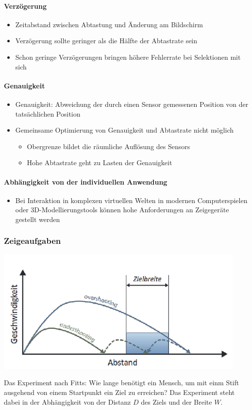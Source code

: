 \documentclass[8pt,a4paper,landscape]{extarticle}
\begin{document}
\begin{multicols*}{4}
	\paragraph{Verzögerung}
	\begin{itemize}
		\item Zeitabstand zwischen Abtastung und Änderung am Bildschirm
		\item Verzögerung sollte geringer als die Hälfte der Abtastrate sein
		\item Schon geringe Verzögerungen bringen höhere Fehlerrate bei
		      Selektionen mit sich
	\end{itemize}
	\paragraph{Genauigkeit}
	\begin{itemize}
		\item Genauigkeit: Abweichung der durch einen Sensor gemessenen Position
		      von der tatsächlichen Position
		\item Gemeinsame Optimierung von Genauigkeit und Abtastrate nicht
		      möglich
		      \begin{itemize}[nolistsep]
			      \item Obergrenze bildet die räumliche Auflösung des Sensors
			      \item Hohe Abtastrate geht zu Lasten der Genauigkeit
		      \end{itemize}
	\end{itemize}
	\paragraph{Abhängigkeit von der individuellen Anwendung}
	\begin{itemize}
		\item Bei Interaktion in komplexen virtuellen Welten in modernen
		      Computerspielen oder 3D-Modellierungstools können hohe
		      Anforderungen an Zeigegeräte gestellt werden
	\end{itemize}
	\subsubsection{Zeigeaufgaben}
	\begin{center}
		\includegraphics[width=0.7\linewidth]{./pictures/figure_03.png}
	\end{center}
	Das Experiment nach Fitts: Wie lange benötigt ein Mensch, um mit einm Stift
	ausgehend von einem Startpunkt ein Ziel zu erreichen? Das Experiment steht
	dabei in der Abhängigkeit von der Distanz \(D\) des Ziels und der Breite
	\(W\).

\end{multicols*}
\end{document}
